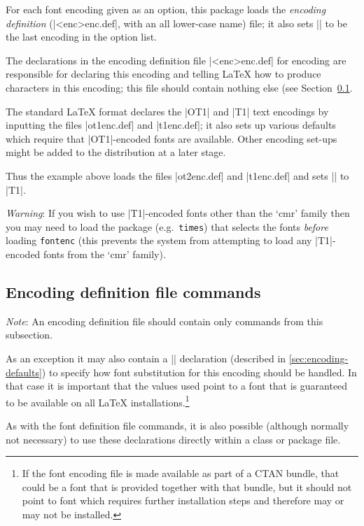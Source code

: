 \documentclass{ltxguide}[1995/11/28]
\begin{document}
For each font encoding  given as an option, this package loads
the \emph{encoding definition} (|<enc>enc.def|, with an all lower-case
name) file; it also sets |\encodingdefault| to be the last encoding in
the option list.

The declarations in the encoding definition file |<enc>enc.def| for
encoding  are responsible for declaring this encoding and telling
\LaTeX{} how to produce characters in this encoding; this file should
contain nothing else (see Section~\ref{sec:encode.def}.

The standard \LaTeX{} format declares the |OT1| and |T1| text encodings
by inputting the files |ot1enc.def| and |t1enc.def|; it also sets up
various defaults which require that |OT1|-encoded fonts are available.
Other encoding set-ups might be added to the distribution at a later
stage.

Thus the example above loads the files |ot2enc.def| and |t1enc.def| and
sets |\encodingdefault| to |T1|.

\emph{Warning}: If you wish to use |T1|-encoded fonts other than the
`cmr' family then you may need to load the package (e.g.~\texttt{times})
that selects the fonts \emph{before} loading \texttt{fontenc} (this
prevents the system from attempting to load any |T1|-encoded fonts from
the `cmr' family).

\subsection{Encoding definition file commands}
\label{sec:encode.def}

\emph{Note}: An encoding definition file should contain only commands
from this subsection.

As an exception it may also contain a |\DeclareFontSubstitution|
declaration (described in \ref{sec:encoding-defaults}) to specify how
font substitution for this encoding should be handled.  In that case it
is important that the values used point to a font that is guaranteed to
be available on all \LaTeX{} installations.\footnote{If the font
  encoding file is made available as part of a CTAN bundle, that could
  be a font that is provided together with that bundle, but it should
  not point to font which requires further installation steps and
  therefore may or may not be installed.}

As with the font definition file commands, it is also possible (although
normally not necessary) to use these declarations directly within a
class or package file.
\end{document}
